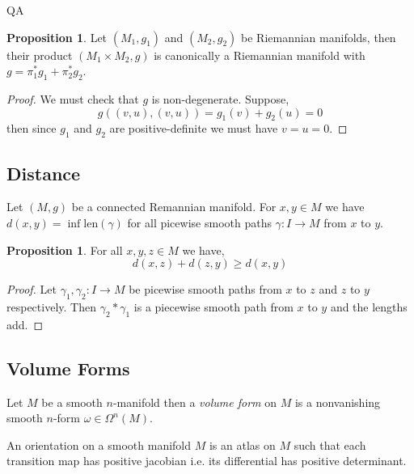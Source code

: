 QA	 \documentclass[12pt]{extarticle}
\theoremstyle{definition}
\newtheorem{proposition}[theorem]{Proposition}
\newenvironment{definition}[1][Definition:]{\begin{trivlist}
\item[\hskip \labelsep {\bfseries #1}]}{\end{trivlist}}
\begin{document}
\begin{proposition}
Let $(M_1, g_1)$ and $(M_2, g_2)$ be Riemannian manifolds, then their product $(M_1 \times M_2, g)$ is canonically a Riemannian manifold with $g = \pi_1^* g_1 + \pi_2^* g_2$. 
\end{proposition}

\begin{proof}
We must check that $g$ is non-degenerate. Suppose,
\[ g((v,u),(v,u)) = g_1(v) + g_2(u) = 0\]
then since $g_1$ and $g_2$ are positive-definite we must have $v = u = 0$. 
\end{proof}

\subsection{Distance}

\newcommand{\len}[1]{\mathrm{len}\left( #1 \right)}

\begin{definition}
Let $(M, g)$ be a connected Remannian manifold. For $x,y \in M$ we have $d(x,y) = \inf{\len{\gamma}}$ for all picewise smooth paths $\gamma : I \to M$ from $x$ to $y$. 
\end{definition}

\begin{proposition}
For all $x,y,z \in M$ we have,
\[ d(x,z) + d(z, y) \ge d(x, y) \]
\end{proposition}

\begin{proof}
Let $\gamma_1, \gamma_2 : I \to M$ be picewise smooth paths from $x$ to $z$ and $z$ to $y$ respectively. Then $\gamma_2 * \gamma_1$ is a piecewise smooth path from $x$ to $y$ and the lengths add.
\end{proof}

\subsection{Volume Forms}

\begin{definition}
Let $M$ be a smooth $n$-manifold then a \textit{volume form} on $M$ is a nonvanishing smooth $n$-form $\omega \in \Omega^n(M)$.  
\end{definition}

\begin{definition}
An orientation on a smooth manifold $M$ is an atlas on $M$ such that each transition map has positive jacobian i.e. its differential has positive determinant. 
\end{definition}
\end{document}

